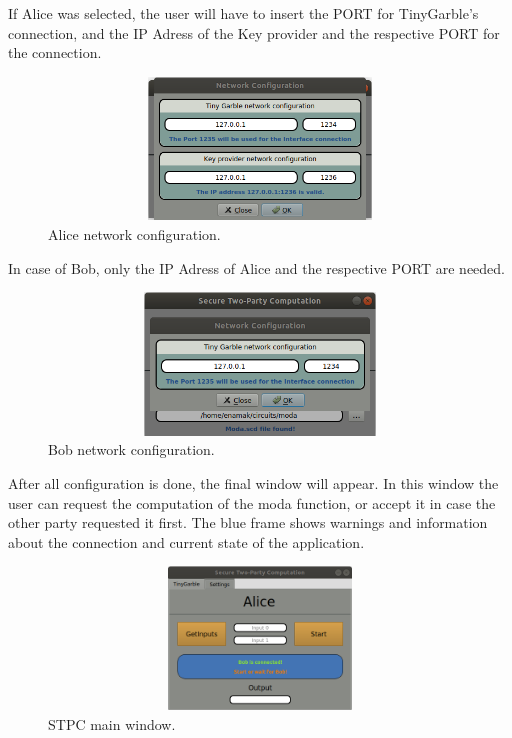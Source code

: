 \begin{refsection}
If Alice was selected, the user will have to insert the PORT for TinyGarble's connection, and the IP Adress of the Key provider and the respective PORT for the connection.


\begin{figure}[H]
	\centering
	\includegraphics[width=1\textwidth, height=3.8cm]{./sdf/tiny_garble/figures/STPC_alice.png}
    \caption{Alice network configuration.}\label{fig:STPC_alice}
\end{figure}

In case of Bob, only the IP Adress of Alice and the respective PORT are needed.


\begin{figure}[H]
	\centering
	\includegraphics[width=1\textwidth, height=3.8cm]{./sdf/tiny_garble/figures/STPC_bob.png}
    \caption{Bob network configuration.}\label{fig:STPC_bob}
\end{figure}

After all configuration is done, the final window will appear. In this window the user can request the computation of the moda function, or accept it in case the other party requested it first.
The blue frame shows warnings and information about the connection and current state of the application.

\begin{figure}[H]
	\centering
	\includegraphics[width=1\textwidth, height=3.8cm]{./sdf/tiny_garble/figures/STPC_a.png}
    \caption{STPC main window.}\label{fig:STPC_a}
\end{figure}


\end{refsection}
